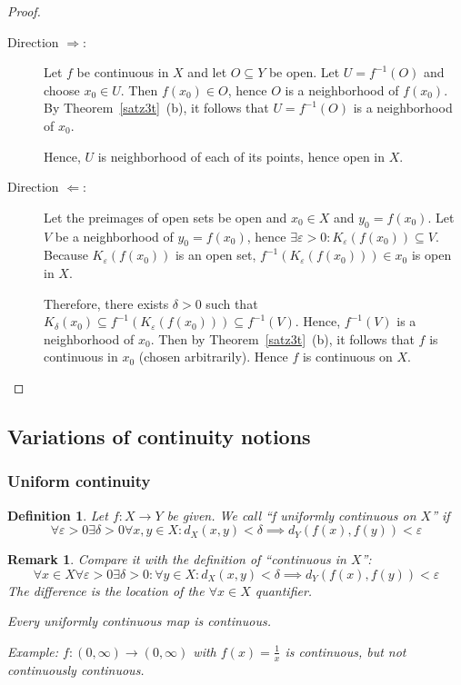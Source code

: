 \documentclass{article}
\newtheorem{definition}{Definition}  \numberwithin{definition}{section}
\newtheorem{remark}{Remark}  \numberwithin{remark}{section}
\begin{document}
\begin{proof}
  \begin{description}
    \item[Direction $\Rightarrow$:]
    Let $f$ be continuous in $X$ and let $O \subseteq Y$ be open. Let $U = f^{-1}(O)$ and choose $x_0 \in U$. Then $f(x_0) \in O$, hence $O$ is a neighborhood of $f(x_0)$. By Theorem~\ref{satz3t}~(b), it follows that $U = f^{-1}(O)$ is a neighborhood of $x_0$.

    Hence, $U$ is neighborhood of each of its points, hence open in $X$.

    \item[Direction $\Leftarrow$:]
    Let the preimages of open sets be open and $x_0 \in X$ and $y_0 = f(x_0)$.
    Let $V$ be a neighborhood of $y_0 = f(x_0)$, hence $\exists \varepsilon > 0: K_{\varepsilon}(f(x_0)) \subseteq V$. Because $K_{\varepsilon}(f(x_0))$ is an open set, $f^{-1}(K_{\varepsilon}(f(x_0))) \in x_0$ is open in $X$.

    Therefore, there exists $\delta > 0$ such that $K_{\delta}(x_0) \subseteq f^{-1}(K_{\varepsilon}(f(x_0))) \subseteq f^{-1}(V)$. Hence, $f^{-1}(V)$ is a neighborhood of $x_0$. Then by Theorem~\ref{satz3t}~(b), it follows that $f$ is continuous in $x_0$ (chosen arbitrarily). Hence $f$ is continuous on $X$.
  \end{description}
\end{proof}

\subsection{Variations of continuity notions}
\subsubsection{Uniform continuity}

\begin{definition} %
  Let $f: X \to Y$ be given.
  We call \enquote{f uniformly continuous on $X$} if
  \[
    \forall \varepsilon > 0 \exists \delta > 0 \forall x, y \in X:
    d_X(x,y) < \delta \implies d_Y(f(x), f(y)) < \varepsilon
  \]
\end{definition}

\begin{remark}
  Compare it with the definition of \enquote{continuous in $X$}:
  \[ \forall x \in X \forall \varepsilon > 0 \exists \delta > 0: \forall y \in X: d_X(x,y) < \delta \implies d_Y(f(x), f(y)) < \varepsilon \]
  The difference is the location of the $\forall x \in X$ quantifier.

  Every uniformly continuous map is continuous.

  Example: $f: (0, \infty) \to (0, \infty)$ with $f(x) = \frac1x$ is continuous, but not continuously continuous.
\end{remark}
\end{document}
